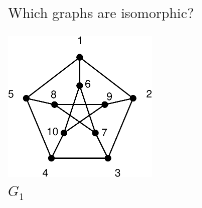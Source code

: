 \documentclass[12pt,twoside]{article}
\begin{document}
\begin{problem}{15}
\begin{figure}[h] %
\begin{center}
\mbox{  
        \hspace{17mm}
         }
\mbox{  
        \hspace{17mm}
        }
\end{center}
\caption{Which graphs are isomorphic?}
\label{fig:isog}
\end{figure}

\iffalse

\begin{figure}[h] %
\includegraphics[width=1.5in,clip]{G1}
\caption{$G_1$}
\label{fig:G1}
\end{figure}


\end{problem}
\end{document}
